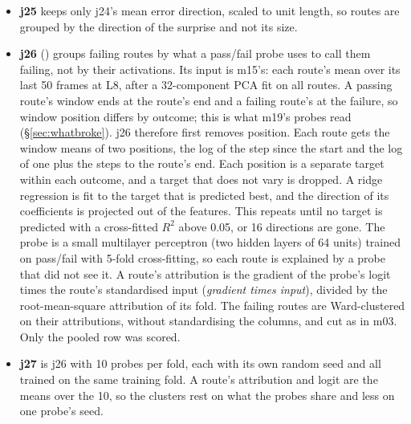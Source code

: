 \begin{itemize}
  \item \textbf{j25} keeps only j24's mean error direction, scaled to unit
        length, so routes are grouped by the direction of the surprise and not
        its size.
  \item \textbf{j26} () groups failing routes by what a
        pass/fail probe uses to call them failing, not by their activations.
        Its input is m15's: each route's mean over its last 50 frames at L8,
        after a 32-component PCA fit on all routes. A passing route's window
        ends at the route's end and a failing route's at the failure, so window
        position differs by outcome; this is what m19's probes read
        (\S\ref{sec:whatbroke}). j26 therefore first removes position. Each
        route gets the window means of two positions, the log of the step since
        the start and the log of one plus the steps to the route's end. Each
        position is a separate target within each outcome, and a target that
        does not vary is dropped. A ridge regression is fit to the target that
        is predicted best, and the direction of its coefficients is projected
        out of the features. This repeats until no target is predicted with a
        cross-fitted $R^2$ above 0.05, or 16 directions are gone. The probe is a small multilayer perceptron (two
        hidden layers of 64 units) trained on pass/fail with 5-fold
        cross-fitting, so each route is explained by a probe that did not see
        it. A route's attribution is the gradient of the probe's logit times
        the route's standardised input (\emph{gradient times input}), divided
        by the root-mean-square attribution of its fold. The failing routes are
        Ward-clustered on their attributions, without standardising the
        columns, and cut as in m03. Only the pooled row was scored.
  \item \textbf{j27} is j26 with 10 probes per fold, each with its own random
        seed and all trained on the same training fold. A route's attribution
        and logit are the means over the 10, so the clusters rest on what the
        probes share and less on one probe's seed.
\end{itemize}

